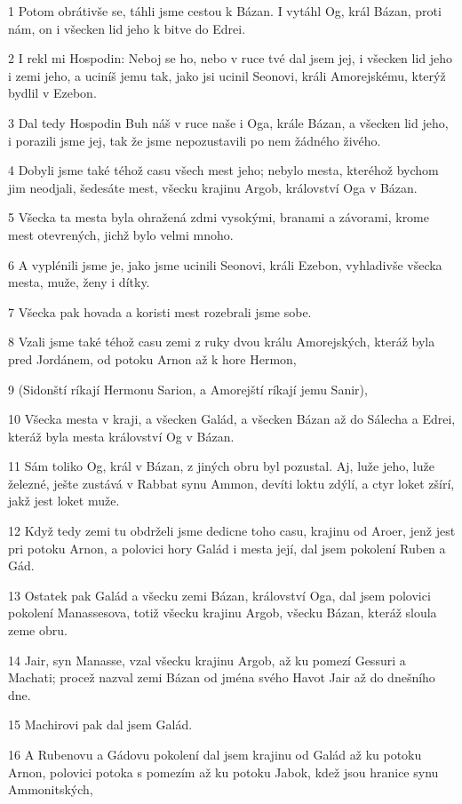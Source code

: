 \par 1 Potom obrátivše se, táhli jsme cestou k Bázan. I vytáhl Og, král Bázan, proti nám, on i všecken lid jeho k bitve do Edrei.
\par 2 I rekl mi Hospodin: Neboj se ho, nebo v ruce tvé dal jsem jej, i všecken lid jeho i zemi jeho, a uciníš jemu tak, jako jsi ucinil Seonovi, králi Amorejskému, kterýž bydlil v Ezebon.
\par 3 Dal tedy Hospodin Buh náš v ruce naše i Oga, krále Bázan, a všecken lid jeho, i porazili jsme jej, tak že jsme nepozustavili po nem žádného živého.
\par 4 Dobyli jsme také téhož casu všech mest jeho; nebylo mesta, kteréhož bychom jim neodjali, šedesáte mest, všecku krajinu Argob, království Oga v Bázan.
\par 5 Všecka ta mesta byla ohražená zdmi vysokými, branami a závorami, krome mest otevrených, jichž bylo velmi mnoho.
\par 6 A vyplénili jsme je, jako jsme ucinili Seonovi, králi Ezebon, vyhladivše všecka mesta, muže, ženy i dítky.
\par 7 Všecka pak hovada a koristi mest rozebrali jsme sobe.
\par 8 Vzali jsme také téhož casu zemi z ruky dvou králu Amorejských, kteráž byla pred Jordánem, od potoku Arnon až k hore Hermon,
\par 9 (Sidonští ríkají Hermonu Sarion, a Amorejští ríkají jemu Sanir),
\par 10 Všecka mesta v kraji, a všecken Galád, a všecken Bázan až do Sálecha a Edrei, kteráž byla mesta království Og v Bázan.
\par 11 Sám toliko Og, král v Bázan, z jiných obru byl pozustal. Aj, luže jeho, luže železné, ješte zustává v Rabbat synu Ammon, devíti loktu zdýlí, a ctyr loket zšírí, jakž jest loket muže.
\par 12 Když tedy zemi tu obdrželi jsme dedicne toho casu, krajinu od Aroer, jenž jest pri potoku Arnon, a polovici hory Galád i mesta její, dal jsem pokolení Ruben a Gád.
\par 13 Ostatek pak Galád a všecku zemi Bázan, království Oga, dal jsem polovici pokolení Manassesova, totiž všecku krajinu Argob, všecku Bázan, kteráž sloula zeme obru.
\par 14 Jair, syn Manasse, vzal všecku krajinu Argob, až ku pomezí Gessuri a Machati; procež nazval zemi Bázan od jména svého Havot Jair až do dnešního dne.
\par 15 Machirovi pak dal jsem Galád.
\par 16 A Rubenovu a Gádovu pokolení dal jsem krajinu od Galád až ku potoku Arnon, polovici potoka s pomezím až ku potoku Jabok, kdež jsou hranice synu Ammonitských,
